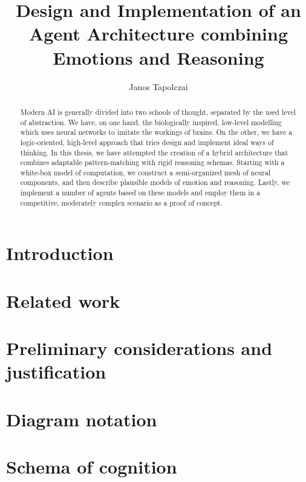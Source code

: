 \documentclass[]{scrartcl}
\title{{\huge Design and Implementation of an Agent Architecture combining Emotions and Reasoning}}
\author{Janos Tapolczai}
\begin{document}
\maketitle


\begin{abstract}
Modern AI is generally divided into two schools of thought, separated by the used level of abstraction. We have, on one hand, the biologically inspired, low-level modelling which uses neural networks to imitate the workings of brains. On the other, we have a logic-oriented, high-level approach that tries design and implement ideal ways of thinking. In this thesis, we have attempted the creation of a hybrid architecture that combines adaptable pattern-matching with rigid reasoning schemas. Starting with a white-box model of computation, we construct a semi-organized mesh of neural components, and then describe plausible models of emotion and reasoning. Lastly, we implement a number of agents based on these models and employ them in a competitive, moderately complex scenario as a proof of concept.
\end{abstract}

\newpage

\hypersetup{linkcolor=black}
\tableofcontents
\hypersetup{linkcolor=DeepBlue}
\newpage

\begingroup
\let\clearpage\relax

\section{Introduction}



\section{Related work}

\section{Preliminary considerations and justification}\label{sec:preliminaries}



\section{Diagram notation}



\section{Schema of cognition}\label{sec:schemaOfCognition}
\end{document}
